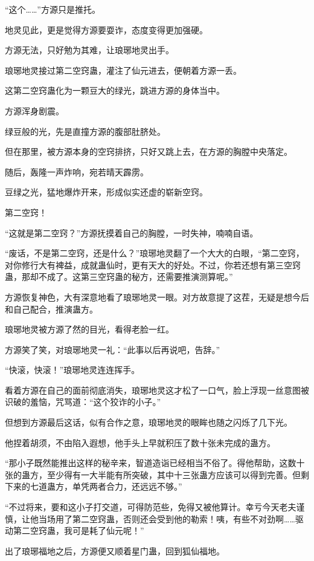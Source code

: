 \begin{this_body}
“这个……”方源只是推托。

地灵见此，更是觉得方源要耍诈，态度变得更加强硬。

方源无法，只好勉为其难，让琅琊地灵出手。

琅琊地灵接过第二空窍蛊，灌注了仙元进去，便朝着方源一丢。

这第二空窍蛊化为一颗豆大的绿光，跳进方源的身体当中。

方源浑身剧震。

绿豆般的光，先是直撞方源的腹部肚脐处。

但在那里，被方源本身的空窍排挤，只好又跳上去，在方源的胸膛中央落定。

随后，轰隆一声炸响，宛若晴天霹雳。

豆绿之光，猛地爆炸开来，形成似实还虚的崭新空窍。

第二空窍！

“这就是第二空窍？”方源抚摸着自己的胸膛，一时失神，喃喃自语。

“废话，不是第二空窍，还是什么？”琅琊地灵翻了一个大大的白眼，“第二空窍，对你修行大有裨益，成就蛊仙时，更有天大的好处。不过，你若还想有第三空窍蛊，那却不成了。这第三空窍蛊的秘方，还需要推演测算呢。”

方源恢复神色，大有深意地看了琅琊地灵一眼。对方故意提了这茬，无疑是想今后和自己配合，推演蛊方。

琅琊地灵被方源了然的目光，看得老脸一红。

方源笑了笑，对琅琊地灵一礼：“此事以后再说吧，告辞。”

“快滚，快滚！”琅琊地灵连连挥手。

看着方源在自己的面前彻底消失，琅琊地灵这才松了一口气，脸上浮现一丝意图被识破的羞恼，咒骂道：“这个狡诈的小子。”

但想到方源最后这话，似有合作之意，琅琊地灵的眼眸也随之闪烁了几下光。

他捏着胡须，不由陷入遐想，他手头上早就积压了数十张未完成的蛊方。

“那小子既然能推出这样的秘辛来，智道造诣已经相当不俗了。得他帮助，这数十张的蛊方，至少得有一大半能有所突破，其中十三张蛊方应该可以得到完善。但剩下来的七道蛊方，单凭两者合力，还远远不够。”

“不过将来，要和这小子打交道，可得防范些，免得又被他算计。幸亏今天老夫谨慎，让他当场用了第二空窍蛊，否则还会受到他的勒索！咦，有些不对劲啊……驱动第二空窍蛊，我可是耗了仙元呢！”

出了琅琊福地之后，方源便又顺着星门蛊，回到狐仙福地。


\end{this_body}
